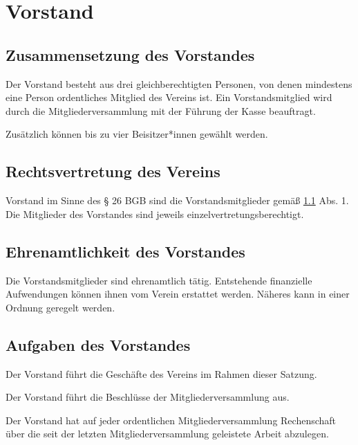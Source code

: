 \chapter{Vorstand}\label{cha:vorstand}

\section{Zusammensetzung des Vorstandes}\label{sec:vorstand}
\begin{absätze}
    \item Der Vorstand besteht aus drei gleichberechtigten Personen, von denen mindestens eine Person ordentliches Mitglied des Vereins ist. Ein Vorstandsmitglied wird durch die Mitgliederversammlung mit der Führung der Kasse beauftragt.
    \item Zusätzlich können bis zu vier Beisitzer*innen gewählt werden.
\end{absätze}

\section{Rechtsvertretung des Vereins}
Vorstand im Sinne des § 26 BGB sind die Vorstandsmitglieder gemäß \ref{sec:vorstand} Abs. 1.
Die Mitglieder des Vorstandes sind jeweils einzelvertretungsberechtigt.

\section{Ehrenamtlichkeit des Vorstandes}
Die Vorstandsmitglieder sind ehrenamtlich tätig. Entstehende finanzielle Aufwendungen können ihnen vom Verein erstattet werden. Näheres kann in einer Ordnung geregelt werden.
    
\section{Aufgaben des Vorstandes}
\begin{absätze}
    \item Der Vorstand führt die Geschäfte des Vereins im Rahmen dieser Satzung.
    \item Der Vorstand führt die Beschlüsse der Mitgliederversammlung aus.
    \item Der Vorstand hat auf jeder ordentlichen Mitgliederversammlung Rechenschaft über die seit der letzten Mitgliederversammlung geleistete Arbeit abzulegen.
\end{absätze}

